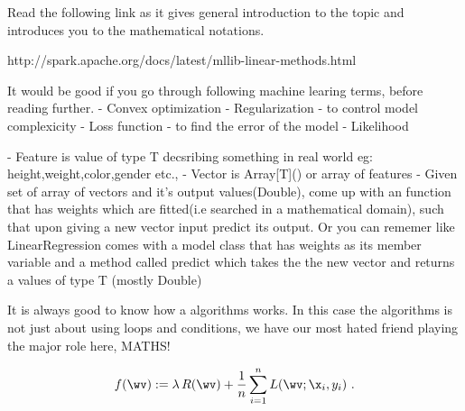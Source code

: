 
Read the following link as it gives general introduction to the topic and introduces you to the
mathematical notations.

http://spark.apache.org/docs/latest/mllib-linear-methods.html

It would be good if you go through following machine learing terms, before reading further.
- Convex optimization
- Regularization - to control model complexicity
- Loss function - to find the error of the model
- Likelihood

- Feature is value of type T decsribing something in real world eg: height,weight,color,gender etc.,
- Vector is Array[T]() or array of features
- Given set of array of vectors and it's output values(Double), come up with an function that has weights
   which are fitted(i.e searched in a mathematical domain), such that upon giving a new vector input predict its output.
   Or you can rememer like LinearRegression comes with a model class that has weights as its member variable and a method
   called predict which takes the the new vector and returns a values of type T (mostly Double)

It is always good to know how a algorithms works. In this case the algorithms is not just about using loops and conditions,
we have our most hated friend playing the major role here, MATHS!

\begin{equation}
    f(\wv) := \lambda\, R(\wv) +
    \frac1n \sum_{i=1}^n L(\wv;\x_i,y_i)
    \label{eq:regPrimal}
    \ .
\end{equation}







